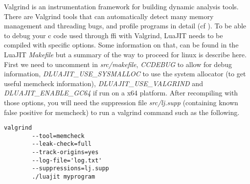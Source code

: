 
Valgrind is an instrumentation framework for building dynamic analysis tools.
There are Valgrind tools that can automatically detect many memory management
and threading bugs, and profile programs in detail (cf \cite{valgrind}). To be
able to debug your c code used through ffi with Valgrind, LuaJIT needs to be
compiled with specific options. Some information on that, can be found in the
LuaJIT \emph{Makefile} but a summary of the way to proceed for linux is describe
here. First we need to uncomment in \emph{src/makefile}, \emph{CCDEBUG} to
allow for debug information, \emph{DLUAJIT\_USE\_SYSMALLOC} to use the system
allocator (to get useful memcheck information), \emph{DLUAJIT\_USE\_VALGRIND}
and \emph{DLUAJIT\_ENABLE\_GC64} if run on a x64 platform. After recompiling
with those options, you will need the suppression file \emph{src/lj.supp}
(containing known false positive for memcheck) to run a valgrind command such as
the following.

\begin{lstlisting}[style=CStyle]
valgrind
		--tool=memcheck
		--leak-check=full
		--track-origins=yes
		--log-file='log.txt'
		--suppressions=lj.supp
		./luajit myprogram
\end{lstlisting}


